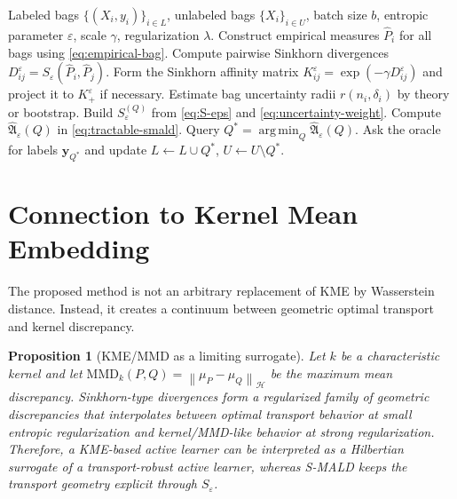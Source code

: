 \documentclass[11pt,a4paper]{article}
\newtheorem{proposition}{Proposition}
\DeclareMathOperator*{\argmin}{arg\,min}
\newcommand{\cH}{\mathcal{H}}
\newcommand{\norm}[1]{\left\lVert #1\right\rVert}
\begin{document}
\begin{algorithm}[t]
\caption{Sinkhorn-Minimax Active Learning on Distributions (S-MALD)}
\label{alg:smald}
\begin{algorithmic}[1]
\REQUIRE Labeled bags $\{(X_i,y_i)\}_{i\in L}$, unlabeled bags $\{X_i\}_{i\in U}$, batch size $b$, entropic parameter $\varepsilon$, scale $\gamma$, regularization $\lambda$.
\STATE Construct empirical measures $\widehat P_i$ for all bags using \eqref{eq:empirical-bag}.
\STATE Compute pairwise Sinkhorn divergences $D^\varepsilon_{ij}=S_\varepsilon(\widehat P_i,\widehat P_j)$.
\STATE Form the Sinkhorn affinity matrix $K^\varepsilon_{ij}=\exp(-\gamma D^\varepsilon_{ij})$ and project it to $K^\varepsilon_+$ if necessary.
\STATE Estimate bag uncertainty radii $r(n_i,\delta_i)$ by theory or bootstrap.
\STATE Build $S_\varepsilon^{(Q)}$ from \eqref{eq:S-eps} and \eqref{eq:uncertainty-weight}.
    \STATE Compute $\widehat{\mathfrak{A}}_\varepsilon(Q)$ in \eqref{eq:tractable-smald}.
\ENDFOR
\STATE Query $Q^*=\argmin_Q \widehat{\mathfrak{A}}_\varepsilon(Q)$.
\STATE Ask the oracle for labels $\bm y_{Q^*}$ and update $L\leftarrow L\cup Q^*$, $U\leftarrow U\setminus Q^*$.
\end{algorithmic}
\end{algorithm}

\section{Connection to Kernel Mean Embedding}

The proposed method is not an arbitrary replacement of KME by Wasserstein distance. Instead, it creates a continuum between geometric optimal transport and kernel discrepancy.

\begin{proposition}[KME/MMD as a limiting surrogate]
\label{prop:kme-limit}
Let $k$ be a characteristic kernel and let $\mathrm{MMD}_k(P,Q)=\norm{\mu_P-\mu_Q}_{\cH}$ be the maximum mean discrepancy. Sinkhorn-type divergences form a regularized family of geometric discrepancies that interpolates between optimal transport behavior at small entropic regularization and kernel/MMD-like behavior at strong regularization. Therefore, a KME-based active learner can be interpreted as a Hilbertian surrogate of a transport-robust active learner, whereas S-MALD keeps the transport geometry explicit through $S_\varepsilon$.
\end{proposition}
\end{document}
